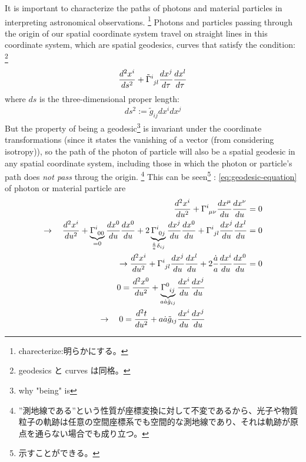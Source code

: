 \documentclass[11pt]{ltjsarticle}
\theoremstyle{plain}
\theoremstyle{break}
\newcommand{\tilg}{\tilde{g}}
\newcommand{\tensorGamma}[1]{\tensor{\Gamma}{ #1}}
\begin{document}
It is important to characterize the paths of photons and material particles in interpreting astronomical observations. \footnote{charecterize:明らかにする。}
Photons and particles passing through the origin of our spatial coordinate system  travel on straight lines in this coordinate system, which are spatial geodesics, curves that satisfy the condition: \footnote{geodesics と curves は同格。}
\begin{align}
\frac{d^2x^{i}}{ds^2} + \tensor{\tilde{\Gamma}}{^i_{jl}} \frac{dx^j}{d\tau} \frac{dx^l}{d\tau}
\end{align}%
where $ds$ is the three-dimensional proper length:
\begin{align}
 ds^2 := \tilde{g}_{ij} dx^i dx^j
\end{align}%
But the property of being a geodesic\footnote{why "being" is} is invariant under the coordinate transformations  (since it states the vanishing of a vector (from considering isotropy)),
so the path of the  photon of particle will also be a spatial geodesic in any spatial coordinate system,
including those in which the photon or particle's path does \textit{not pass} throug the origin.
\footnote{”測地線である”という性質が座標変換に対して不変であるから、光子や物質粒子の軌跡は任意の空間座標系でも空間的な測地線であり、それは軌跡が原点を通らない場合でも成り立つ。}
This can be seen\footnote{示すことができる。} :
\eqref{eq:geodesic-equation} of photon or material particle are
\begin{align}
  \frac{d^2 x^{i}}{du^{2}}+\tensorGamma{^i_{\mu\nu}}\frac{dx^\mu}{du}\frac{dx^\nu}{du} &=0  \\
\rightarrow\quad
  \frac{d^2 x^{i}}{du^{2}}
  + \underbrace{\tensorGamma{^i_{00}}}_{=0}\frac{dx^0}{du}\frac{dx^0}{du}
  + 2 \underbrace{\tensorGamma{^i_{0j}}}_{\frac{\dot{a}}{a} \delta_{ij}}
  \frac{dx^j}{du}\frac{dx^0}{du}
  + \tensorGamma{^i_{jl}}\frac{dx^j}{du}\frac{dx^l}{du} &= 0\\
  \rightarrow
  \frac{d^2 x^{i}}{du^{2}}
  + \tensorGamma{^i_{jl}}\frac{dx^j}{du}\frac{dx^l}{du}
  + 2 \frac{\dot{a}}{a} \frac{dx^i}{du}\frac{dx^0}{du}
  &= 0 \label{eq:1.1.26}
\end{align}
\begin{align}
  0=\frac{d^2 x^{0}}{du^{2}}+
  \underbrace{\tensorGamma{^0_{ij}}}_{a \dot{a}\tilde{g}_{ij}}\frac{dx^i}{du}\frac{dx^j}{du}   \\
  \rightarrow \quad 0 =  \frac{d^2t}{du^2} + a \dot{a} \tilg_{ij} \frac{dx^i}{du}\frac{dx^j}{du} \label{eq:1.1.26}
\end{align}
\end{document}
